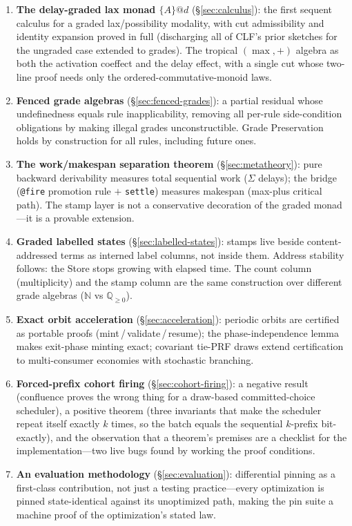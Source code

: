 \documentclass[11pt]{article}
\makeatletter
\newcommand{\laxm}[2]{\{#1\}@{#2}}
\newcommand{\N}{\mathbb{N}}
\newcommand{\Qnn}{\mathbb{Q}_{\geq 0}}
\theoremstyle{remark}
\makeatother
\begin{document}
\begin{enumerate}
\item \textbf{The delay-graded lax monad $\laxm{A}{d}$} (\S\ref{sec:calculus}):
  the first sequent calculus for a graded lax/possibility modality, with cut
  admissibility and identity expansion proved in full (discharging all of CLF's
  prior sketches for the ungraded case extended to grades).  The tropical
  $(\max,{+})$ algebra as both the activation coeffect and the delay effect, with
  a single cut whose two-line proof needs only the ordered-commutative-monoid laws.

\item \textbf{Fenced grade algebras} (\S\ref{sec:fenced-grades}): a partial
  residual whose undefinedness equals rule inapplicability, removing all per-rule
  side-condition obligations by making illegal grades unconstructible.  Grade
  Preservation holds by construction for all rules, including future ones.

\item \textbf{The work/makespan separation theorem}
  (\S\ref{sec:metatheory}): pure backward derivability measures total sequential
  work ($\Sigma$ delays); the bridge (\texttt{@fire} promotion rule $+$
  \texttt{settle}) measures makespan (max-plus critical path).  The stamp layer
  is not a conservative decoration of the graded monad---it is a provable
  extension.

\item \textbf{Graded labelled states} (\S\ref{sec:labelled-states}): stamps live
  beside content-addressed terms as interned label columns, not inside them.
  Address stability follows: the Store stops growing with elapsed time.  The count
  column (multiplicity) and the stamp column are the same construction over
  different grade algebras ($\N$ vs $\Qnn$).

\item \textbf{Exact orbit acceleration} (\S\ref{sec:acceleration}): periodic
  orbits are certified as portable proofs (mint\,/\,validate\,/\,resume); the
  phase-independence lemma makes exit-phase minting exact; covariant tie-PRF draws
  extend certification to multi-consumer economies with stochastic branching.

\item \textbf{Forced-prefix cohort firing} (\S\ref{sec:cohort-firing}): a
  negative result (confluence proves the wrong thing for a draw-based
  committed-choice scheduler), a positive theorem (three invariants that make the
  scheduler repeat itself exactly $k$ times, so the batch equals the sequential
  $k$-prefix bit-exactly), and the observation that a theorem's premises are a
  checklist for the implementation---two live bugs found by working the proof
  conditions.

\item \textbf{An evaluation methodology} (\S\ref{sec:evaluation}): differential
  pinning as a first-class contribution, not just a testing practice---every
  optimization is pinned state-identical against its unoptimized path, making the
  pin suite a machine proof of the optimization's stated law.
\end{enumerate}
\end{document}
